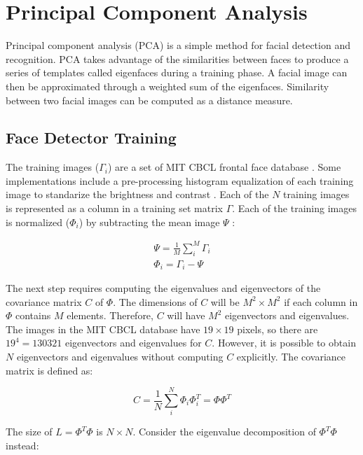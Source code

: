 \documentclass[10pt,letterpaper]{article}
\begin{document}
\section{Principal Component Analysis}

Principal component analysis (PCA) is a simple method 
for facial detection and recognition. PCA takes advantage of the similarities
between faces to produce a series of templates called eigenfaces during a training
phase. A facial image can then be approximated through a weighted sum of the
eigenfaces. Similarity between two facial images can be computed as a distance
measure. 

\subsection{Face Detector Training}

The training images ($\Gamma_i$) are a set of MIT CBCL frontal face database 
\cite{mit_cbcl}. Some implementations include a pre-processing histogram equalization 
of each  training image to standarize the brightness and contrast \cite{emami_2010}. 
Each of the $N$ training images is represented as a column in a training set 
matrix $\Gamma$. Each of the training images is normalized ($\Phi_i$) by 
subtracting the mean image $\Psi$ \cite{pissarenko_2003}: 
    
\begin{eqnarray}
    \Psi = \frac{1}{M}\sum_i^M \Gamma_i \\
    \Phi_i = \Gamma_i - \Psi
\end{eqnarray}

The next step requires computing the eigenvalues and eigenvectors of the 
covariance matrix $C$ of $\Phi$. The dimensions of $C$ 
will be $M^2 \times M^2$ if each column in $\Phi$ contains $M$ elements.
Therefore, $C$ will have $M^2$ eigenvectors and eigenvalues. The images in 
the MIT CBCL database have $19 \times 19$ pixels, so there are $19^4 = 130321$ 
eigenvectors and eigenvalues for $C$.  
However, it is possible to obtain $N$ eigenvectors and eigenvalues without 
computing $C$ explicitly. The covariance matrix is defined as:

\begin{equation}
    C = \frac{1}{N} \sum_i^N \Phi_i \Phi_i^T = \Phi \Phi^T
\end{equation}

The size of $L = \Phi^T \Phi$ is $N \times N$. Consider the eigenvalue decomposition 
of $\Phi^T \Phi$ instead:
\end{document}

